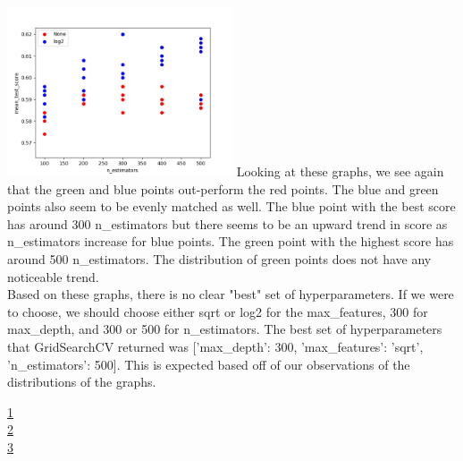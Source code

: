 \documentclass[12pt]{article}
\newcommand{\nextproblem}{
	\vfill
	\pagebreak
}
\begin{document}
\includegraphics[width=0.5\textwidth]{RF_n_estimators3.png}
Looking at these graphs, we see again that the green and blue points out-perform the red points. The blue and green points also seem to be evenly matched as well. The blue point with the best score has around 300 n\_estimators but there seems to be an upward trend in score as n\_estimators increase for blue points. The green point with the highest score has around 500 n\_estimators. The distribution of green points does not have any noticeable trend. \\
Based on these graphs, there is no clear "best" set of hyperparameters. If we were to choose, we should choose either sqrt or log2 for the max\_features, 300 for max\_depth, and 300 or 500 for n\_estimators. The best set of hyperparameters that GridSearchCV returned was ['max\_depth': 300, 'max\_features': 'sqrt', 'n\_estimators': 500]. This is expected based off of our observations of the distributions of the graphs.

\nextproblem

\href{https://www.quora.com/What-are-C-and-gamma-with-regards-to-a-support-vector-machine}{1} \\
\href{https://scikit-learn.org/stable/auto_examples/svm/plot_rbf_parameters.html}{2} \\
\href{https://machinelearningmastery.com/save-load-machine-learning-models-python-scikit-learn/}{3} \\
\end{document}
